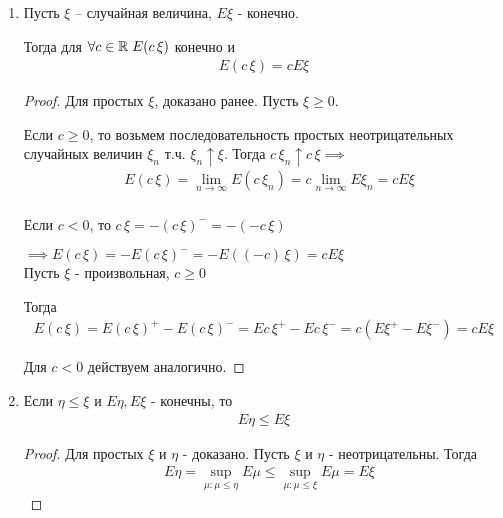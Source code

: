 \begin{enumerate}[label=\protect\circled{\arabic*},series=mean_properties]

  \item
    Пусть $\xi$ -- случайная величина, $E \xi$ - конечно.

    Тогда для $\forall c \in \mathbb{R} \; E(c\,\xi)$ конечно и
    \begin{align*}
      E(c\,\xi) = c E \xi
    \end{align*}

    \begin{proof}
      Для простых $\xi$, доказано ранее. Пусть $\xi \geq 0$. 

      Если $c \geq 0$, то возьмем последовательность простых неотрицательных 
      случайных величин $\xi_n$ т.ч. $\xi_n \uparrow \xi$.
      Тогда $c\, \xi_n \uparrow c\, \xi \implies$
      \begin{align*}
        &E (c\,\xi) = \lim_{n \to \infty} E(c\,\xi_n) = 
        c \lim_{n \to \infty} E \xi_n = c E \xi\\
      \end{align*}

      Если $c < 0$, то $c\,\xi = - (c\,\xi)^- = -(-c\,\xi)$

      $\implies E(c\,\xi) = - E(c\,\xi)^- = - E((-c)\,\xi) = c E \xi$\\

      Пусть $\xi$ - произвольная, $c \geq 0$

      Тогда 
      \begin{align*}
        E(c\,\xi) = E(c\,\xi)^+ - E(c\,\xi)^- = 
        E c\,\xi^+ - E c\,\xi^- = c (E \xi^+ - E \xi^-) = c E \xi
      \end{align*}


      Для $c < 0$ действуем аналогично.
    \end{proof}

  \item
    Если $\eta \leq \xi$ и $E \eta, E\xi$ - конечны, то 
    \begin{align*}
      E \eta \leq E \xi
    \end{align*}

    \begin{proof}
      Для простых $\xi$ и $\eta$ - доказано. Пусть $\xi$ и $\eta$ - неотрицательны. 
      Тогда
      \begin{align*}
        &E \eta = \sup_{\mu : \mu \leq \eta} E \mu
        \leq \sup_{\mu : \mu \leq \xi} E \mu = E \xi
      \end{align*}


\end{proof}
\end{enumerate}
